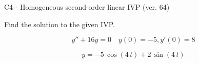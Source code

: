 \begin{exercise}
  \begin{exerciseTitle}C4 - Homogeneous second-order linear IVP (ver. 64)\end{exerciseTitle}
  \begin{exerciseStatement}
    
Find the solution to the given IVP.

    
\[y''+16y = 0 \hspace{1em} y(0) = -5 , y'(0) = 8\]

  \end{exerciseStatement}
  \begin{exerciseAnswer}
    
\[y= -5 \, \cos\left(4 \, t\right) + 2 \, \sin\left(4 \, t\right)\]

  \end{exerciseAnswer}
\end{exercise}